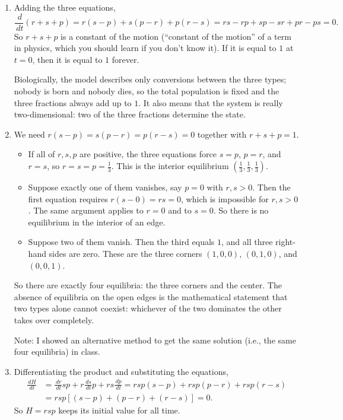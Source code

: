 \documentclass[a4paper,12pt]{article}
\newcommand{\dd}{\,d}
\begin{document}
\begin{enumerate}[label=(\alph*)]
\item Adding the three equations,
\[ \frac{\dd}{\dd t}\left( r+s+p \right) = r(s-p)+s(p-r)+p(r-s)
= rs-rp+sp-sr+pr-ps = 0 . \]
So $r+s+p$ is a constant of the motion (``constant of the motion'' of a term in physics, which you should learn if you don't know it). If it is equal to $1$ at $t=0$, then it is equal to $1$ forever.

Biologically, the model describes only conversions between the three types; nobody is born and nobody dies, so the total population is fixed and the three fractions always add up to $1$. It also means that the system is really two-dimensional: two of the three fractions determine the state.

\item We need $r(s-p)=s(p-r)=p(r-s)=0$ together with $r+s+p=1$.
\begin{itemize}
\item If all of $r,s,p$ are positive, the three equations force $s=p$, $p=r$, and $r=s$, so $r=s=p=\frac{1}{3}$. This is the interior equilibrium $\left( \frac13,\frac13,\frac13 \right)$.
\item Suppose exactly one of them vanishes, say $p=0$ with $r,s>0$. Then the first equation requires $r(s-0)=rs=0$, which is impossible for $r,s>0$. The same argument applies to $r=0$ and to $s=0$. So there is no equilibrium in the interior of an edge.
\item Suppose two of them vanish. Then the third equals $1$, and all three right-hand sides are zero. These are the three corners $(1,0,0)$, $(0,1,0)$, and $(0,0,1)$.
\end{itemize}
So there are exactly four equilibria: the three corners and the center. The absence of equilibria on the open edges is the mathematical statement that two types alone cannot coexist: whichever of the two dominates the other takes over completely.

Note: I showed an alternative method to get the same solution (i.e., the same four equilibria) in class.

\item Differentiating the product and substituting the equations,
\[ \begin{aligned}
\frac{\dd H}{\dd t} &= \frac{\dd r}{\dd t}sp + r\frac{\dd s}{\dd t}p + rs\frac{\dd p}{\dd t}
= rsp\left( s-p \right) + rsp\left( p-r \right) + rsp\left( r-s \right)\\
&= rsp\left[ (s-p)+(p-r)+(r-s) \right] = 0 .
\end{aligned} \]
So $H=rsp$ keeps its initial value for all time.


\end{enumerate}
\end{document}
